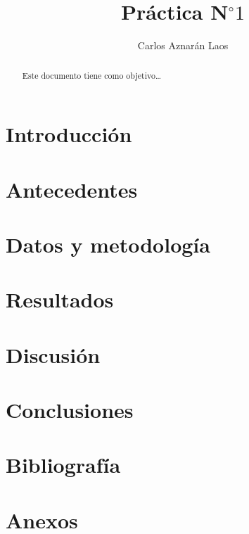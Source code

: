 \documentclass[12pt,a4paper]{article}
\author{Carlos Aznarán Laos}
\title{Práctica N$^{\circ}1$}
\begin{document}
\maketitle

\begin{abstract}
	Este documento tiene como objetivo\ldots
\end{abstract}

\section{Introducción}

\section{Antecedentes}

\section{Datos y metodología}

\section{Resultados}

\section{Discusión}

\section{Conclusiones}

\section*{Bibliografía}

\section*{Anexos}
\end{document}
